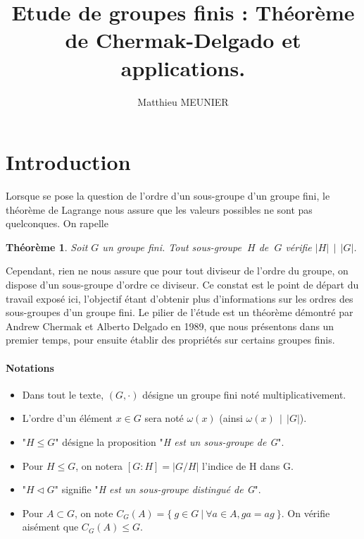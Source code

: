\documentclass[10pt,a4paper]{article}
\author{Matthieu MEUNIER}
\title{Etude de groupes finis : Théorème de Chermak-Delgado et applications.}
\date{}
\newtheorem{theorem}{Théorème}
\begin{document}
\maketitle
\newpage
{}
\tableofcontents


\section{Introduction}

Lorsque se pose la question de l'ordre d'un sous-groupe d'un groupe fini, le théorème de Lagrange nous assure que les valeurs possibles ne sont pas quelconques. On rapelle
\begin{theorem}

    Soit $G$ un groupe fini. Tout sous-groupe $\:H$ de $\:G$ vérifie $|H| \: \: | \: \: |G|$.

\end{theorem}

Cependant, rien ne nous assure que pour tout diviseur de l'ordre du groupe, on dispose d'un sous-groupe d'ordre ce diviseur. Ce constat est le point de départ du travail exposé ici, l'objectif étant d'obtenir plus d'informations sur les ordres des sous-groupes d'un groupe fini. Le pilier de l'étude est un théorème démontré par Andrew Chermak et Alberto Delgado en 1989, que nous présentons dans un premier temps, pour ensuite établir des propriétés sur certains groupes finis.

\paragraph{Notations}
\smallbreak
\renewcommand{\labelitemi}{$\bullet$}
\begin{itemize}


    \item Dans tout le texte, $(G,\cdot)$ désigne un groupe fini noté multiplicativement.
    \item L'ordre d'un élément $x \in G$ sera noté $\omega (x)$ (ainsi $\omega (x) \: \: | \:\: |G|$).
    \item "$H \leq G$" désigne la proposition "\textit{H est un sous-groupe de G}".
    \item Pour $H \leq G$, on notera $[G:H]=|G/H|$ l'indice de H dans G.
    \item "$H \triangleleft G$" signifie "\textit{H est un sous-groupe distingué de G}".
    \item Pour $A \subset G$, on note $C_{G}(A)=\{\: g \in G \: | \: \forall a \in A, ga=ag \: \}$. On vérifie aisément que $C_{G}(A) \leq G$.
\end{itemize}
\end{document}
